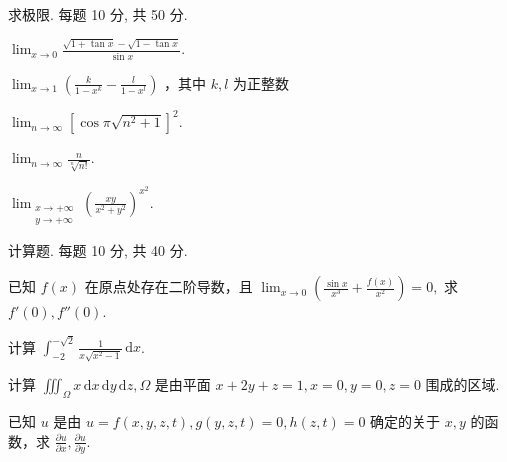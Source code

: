 \par{}
求极限. 每题 10 分, 共 50 分.\par
$\lim_{x\to 0}\frac{\sqrt{1 + \tan x} - \sqrt{1 - \tan x}}{\sin x}.$\par
$\lim_{x\to 1}\left(\frac{k}{1 - x^k} -\frac{l}{1 - x^l}\right)$ ，其中 $k,l$ 为正整数\par
$\lim_{n\to \infty}[\cos \pi \sqrt{n^2 + 1}]^2.$\par
$\lim_{n\to\infty}\frac{n}{\sqrt[n]{n!}}.$\par
$\lim_{\substack{x\to+\infty\\ y\to+\infty}}\left(\frac{xy}{x^{2}+y^{2}}\right)^{x^{2}}.$\par
\par{}
计算题. 每题 10 分, 共 40 分.\par
已知 $f(x)$ 在原点处存在二阶导数，且 $\lim_{x\to 0}\left(\frac{\sin x}{x^3} +\frac{f(x)}{x^2}\right) = 0,$ 求 $f'(0), f''(0).$\par
计算 $\int_{-2}^{-\sqrt{2}} \frac{1}{x \sqrt{x^2 - 1}} \, \mathrm{d}x$.\par
计算 $\iiint_{\Omega} x \, \mathrm{d}x \, \mathrm{d}y \, \mathrm{d}z, \Omega$ 是由平面 $x + 2y + z = 1, x = 0, y = 0, z = 0$ 围成的区域.\par
已知 $u$ 是由 $u = f(x, y, z, t), g(y, z, t) = 0, h(z, t) = 0$ 确定的关于 $x, y$ 的函数，求 $\frac{\partial u}{\partial x}, \frac{\partial u}{\partial y}$.\par
\par{}
\par{}
